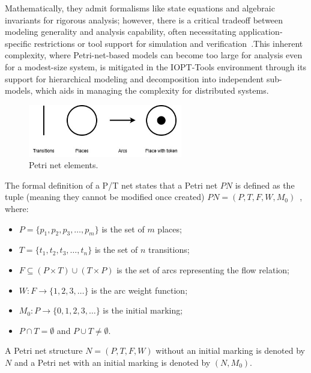  Mathematically, they admit formalisms like state equations and algebraic invariants for rigorous analysis; however, there is a critical tradeoff between modeling generality and analysis capability, often necessitating application‐specific restrictions or tool support for simulation and verification~\cite{murata}.This inherent complexity, where Petri-net-based models can become too large for analysis even for a modest-size system, is mitigated in the IOPT-Tools environment through its support for hierarchical modeling and decomposition into independent sub-models, which aids in managing the complexity for distributed systems.


\begin{figure}[htbp]
  \centering
  \includegraphics[width=0.6\textwidth]{Chapters/Figures/petri_image.jpg}
  \caption{Petri net elements.}
  \label{fig:petri_diagrama}
\end{figure}



The formal definition of a P/T net states that a Petri net \( PN \) is defined as the tuple (meaning they cannot be modified once created) \( PN = (P, T, F, W, M_0) \)~\cite{murata}, where:


\begin{itemize}
    \item \( P = \{ p_1, p_2, p_3, \ldots, p_m \} \) is the set of \( m \) places;
    \item \( T = \{ t_1, t_2, t_3, \ldots, t_n \} \) is the set of \( n \) transitions;
    \item \( F \subseteq (P \times T) \cup (T \times P) \) is the set of arcs representing the flow relation;
    \item \( W : F \to \{1,2,3,\ldots\} \) is the arc weight function;
    \item \( M_0 : P \to \{0,1,2,3,\ldots\} \) is the initial marking;
    \item \( P \cap T = \emptyset \) and \( P \cup T \neq \emptyset \).
\end{itemize}

A Petri net structure \( N = (P, T, F, W) \) without an initial marking is denoted by \( N \) and a Petri net with an initial marking is denoted by \( (N, M_0) \).


